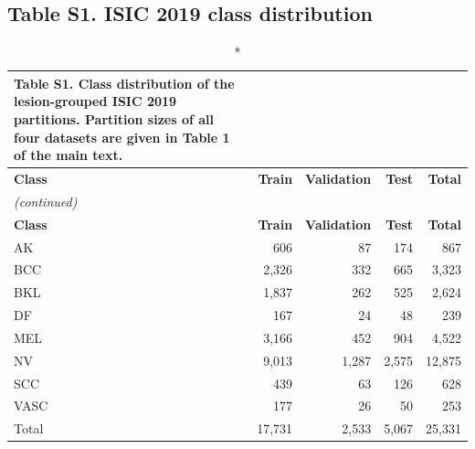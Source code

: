 \documentclass[10pt]{article}
\begin{document}
\subsection*{Table S1. ISIC 2019 class distribution}
\footnotesize
\setlength{\tabcolsep}{3pt}
\begin{longtable}{lrrrr}
\caption*{\textbf{Table S1.} Class distribution of the lesion-grouped ISIC 2019 partitions. Partition sizes of all four datasets are given in Table 1 of the main text.}\\
\toprule
\textbf{Class} & \textbf{Train} & \textbf{Validation} & \textbf{Test} & \textbf{Total} \\
\midrule
\endfirsthead
\multicolumn{5}{l}{\textit{(continued)}}\\
\toprule
\textbf{Class} & \textbf{Train} & \textbf{Validation} & \textbf{Test} & \textbf{Total} \\
\midrule
\endhead
\bottomrule
\endfoot
AK & 606 & 87 & 174 & 867 \\
BCC & 2,326 & 332 & 665 & 3,323 \\
BKL & 1,837 & 262 & 525 & 2,624 \\
DF & 167 & 24 & 48 & 239 \\
MEL & 3,166 & 452 & 904 & 4,522 \\
NV & 9,013 & 1,287 & 2,575 & 12,875 \\
SCC & 439 & 63 & 126 & 628 \\
VASC & 177 & 26 & 50 & 253 \\
\midrule
Total & 17,731 & 2,533 & 5,067 & 25,331 \\
\end{longtable}
\vspace{-6pt}{\footnotesize Images without a lesion identifier: 2,084 (each treated as its own group). Lesions shared between partitions: 0. AK, actinic keratosis; BCC, basal cell carcinoma; BKL, benign keratosis-like lesion; DF, dermatofibroma; MEL, melanoma; NV, melanocytic nevus; SCC, squamous cell carcinoma; VASC, vascular lesion.\par}
\normalsize
\end{document}
